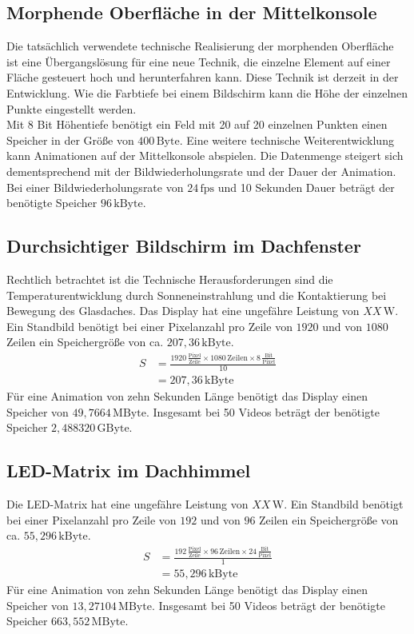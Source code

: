 \subsection{Morphende Oberfläche in der Mittelkonsole}
Die tatsächlich verwendete technische Realisierung der morphenden Oberfläche ist eine Übergangslösung für eine neue Technik, die einzelne Element auf einer Fläche gesteuert hoch und herunterfahren kann. Diese Technik ist derzeit in der Entwicklung. Wie die Farbtiefe bei einem Bildschirm kann die Höhe der einzelnen Punkte eingestellt werden. \\
Mit 8 Bit Höhentiefe benötigt ein Feld mit 20 auf 20 einzelnen Punkten einen Speicher in der Größe von $ 400\,\mathrm{Byte}$.
Eine weitere technische Weiterentwicklung kann Animationen auf der Mittelkonsole abspielen. Die Datenmenge steigert sich dementsprechend mit der Bildwiederholungsrate und der Dauer der Animation. Bei einer Bildwiederholungsrate von $ 24\,\mathrm{fps} $ und 10 Sekunden Dauer beträgt der benötigte Speicher $ 96\,\mathrm{kByte}$.
\subsection{Durchsichtiger Bildschirm im Dachfenster}
Rechtlich betrachtet ist die 
Technische Herausforderungen sind die Temperaturentwicklung durch Sonneneinstrahlung und die Kontaktierung bei Bewegung des Glasdaches.
Das Display hat eine ungefähre Leistung von $ XX\,\mathrm{W} $. 
Ein Standbild benötigt bei einer Pixelanzahl pro Zeile von $ 1920 $ und von $ 1080 $ Zeilen ein Speichergröße von ca. $ 207,36\,\mathrm{kByte}$. 
\begin{align}
	S &= \frac{1920\,\frac{\mathrm{Pixel}}{\mathrm{Zeile}}\times 1080\,\mathrm{Zeilen} \times 8\,\frac{\mathrm{Bit}}{\mathrm{Pixel}}}{10} \\
	&= 207,36\,\mathrm{kByte}
\end{align}
Für eine Animation von zehn Sekunden Länge benötigt das Display einen Speicher von $ 49,7664\,\mathrm{MByte}$.
Insgesamt bei 50 Videos beträgt der benötigte Speicher $ 2,488320\,\mathrm{GByte}$.
\subsection{LED-Matrix im Dachhimmel}
Die LED-Matrix hat eine ungefähre Leistung von $ XX\,\mathrm{W} $. 
Ein Standbild benötigt bei einer Pixelanzahl pro Zeile von $ 192 $ und von $ 96 $ Zeilen ein Speichergröße von ca. $ 55,296\,\mathrm{kByte}$. 
\begin{align}
	S &= \frac{192\,\frac{\mathrm{Pixel}}{\mathrm{Zeile}}\times 96\,\mathrm{Zeilen} \times 24\,\frac{\mathrm{Bit}}{\mathrm{Pixel}}}{1} \\
	&= 55,296\,\mathrm{kByte}
\end{align}
Für eine Animation von zehn Sekunden Länge benötigt das Display einen Speicher von $ 13,27104\,\mathrm{MByte}$.
Insgesamt bei 50 Videos beträgt der benötigte Speicher $ 663,552\,\mathrm{MByte}$.
